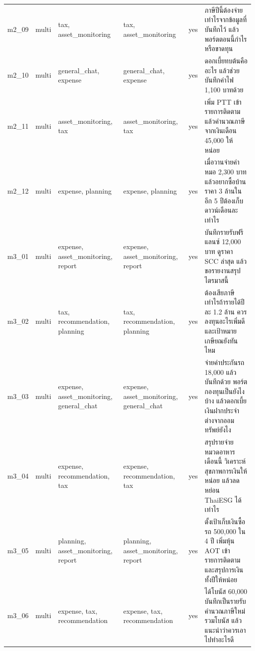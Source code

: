 \documentclass[11pt,a4paper]{article}
\begin{document}
{\begin{longtable}{llp{3.2cm}p{3.2cm}lp{5.3cm}}
m2\_\allowbreak{}09 & multi & tax, asset\_\allowbreak{}monitoring & tax, asset\_\allowbreak{}monitoring & yes & {\thaifont ภาษีปีนี้ต้องจ่ายเท่าไรจากข้อมูลที่บันทึกไว้ แล้วพอร์ตตอนนี้กำไรหรือขาดทุน} \\
m2\_\allowbreak{}10 & multi & general\_\allowbreak{}chat, expense & general\_\allowbreak{}chat, expense & yes & {\thaifont ดอกเบี้ยทบต้นคืออะไร แล้วช่วยบันทึกค่าไฟ }1,100 {\thaifont บาทด้วย} \\
m2\_\allowbreak{}11 & multi & asset\_\allowbreak{}monitoring, tax & asset\_\allowbreak{}monitoring, tax & yes & {\thaifont เพิ่ม }PTT {\thaifont เข้ารายการติดตาม แล้วคำนวณภาษีจากเงินเดือน }45,000 {\thaifont ให้หน่อย} \\
m2\_\allowbreak{}12 & multi & expense, planning & expense, planning & yes & {\thaifont เมื่อวานจ่ายค่าหมอ }2,300 {\thaifont บาท แล้วอยากซื้อบ้านราคา }3 {\thaifont ล้านในอีก }5 {\thaifont ปีต้องเก็บดาวน์เดือนละเท่าไร} \\
m3\_\allowbreak{}01 & multi & expense, asset\_\allowbreak{}monitoring, report & expense, asset\_\allowbreak{}monitoring, report & yes & {\thaifont บันทึกรายรับฟรีแลนซ์ }12,000 {\thaifont บาท ดูราคา }SCC {\thaifont ล่าสุด แล้วขอรายงานสรุปไตรมาสนี้} \\
m3\_\allowbreak{}02 & multi & tax, recommendation, planning & tax, recommendation, planning & yes & {\thaifont ต้องเสียภาษีเท่าไรถ้ารายได้ปีละ }1.2 {\thaifont ล้าน ควรลงทุนอะไรเพิ่มดี และเป้าหมายเกษียณยังทันไหม} \\
m3\_\allowbreak{}03 & multi & expense, asset\_\allowbreak{}monitoring, general\_\allowbreak{}chat & expense, asset\_\allowbreak{}monitoring, general\_\allowbreak{}chat & yes & {\thaifont จ่ายค่าประกันรถ }18,000 {\thaifont แล้ว บันทึกด้วย พอร์ตกองทุนเป็นยังไงบ้าง แล้วดอกเบี้ยเงินฝากประจำต่างจากออมทรัพย์ยังไง} \\
m3\_\allowbreak{}04 & multi & expense, recommendation, tax & expense, recommendation, tax & yes & {\thaifont สรุปรายจ่ายหมวดอาหารเดือนนี้ วิเคราะห์สุขภาพการเงินให้หน่อย แล้วลดหย่อน }ThaiESG {\thaifont ได้เท่าไร} \\
m3\_\allowbreak{}05 & multi & planning, asset\_\allowbreak{}monitoring, report & planning, asset\_\allowbreak{}monitoring, report & yes & {\thaifont ตั้งเป้าเก็บเงินซื้อรถ }500,000 {\thaifont ใน }4 {\thaifont ปี เพิ่มหุ้น }AOT {\thaifont เข้ารายการติดตาม และสรุปการเงินทั้งปีให้หน่อย} \\
m3\_\allowbreak{}06 & multi & expense, tax, recommendation & expense, tax, recommendation & yes & {\thaifont ได้โบนัส }60,000 {\thaifont บันทึกเป็นรายรับ คำนวณภาษีใหม่รวมโบนัส แล้วแนะนำว่าควรเอาไปทำอะไรดี} \\

\end{longtable}}
\end{document}
